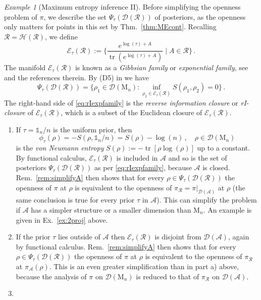 \documentclass[a4paper,11pt,reqno]{amsart}
\newcommand{\M}{\mathrm{M}}
\newcommand{\cA}{\mathcal{A}}
\newcommand{\cD}{\mathcal{D}}
\newcommand{\cE}{\mathcal{E}}
\newcommand{\cH}{\mathcal{H}}
\newcommand{\cR}{\mathcal{R}}
\newcommand{\id}{\mathds{1}}
\DeclareMathOperator\tr{tr}
\theoremstyle{definition}
\theoremstyle{remark}
\newtheorem{exa}[thm]{Example}
\numberwithin{equation}{section}
\begin{document}
\begin{exa}[Maximum entropy inference II]\label{exa:ME2}
Before simplifying the openness problem of $\pi$, we describe the set 
$\Psi_\tau(\cD(\cR))$ of posteriors, as the openness only matters for
points in this set by Thm.~\ref{thm:MEcont}. Recalling $\cR=\cH(\cR)$, 
we define 
\[\textstyle
\cE_\tau(\cR)
:=\big\{ \frac{e^{\log(\tau)+A}}{\tr(e^{\log(\tau)+A})} \mid A\in\cR\big\}\,.
\]
The manifold $\cE_\tau(\cR)$ is known as a \emph{Gibbsian family} or 
\emph{exponential family}, see 
\cite{WeisKnauf2012,Niekamp-etal2013,Weis2014,Pavlov-etal2024} and the 
references therein. By (D5) in \cite{Weis2014} we have
\begin{equation}\label{eq:rIexpfamily}\textstyle
\Psi_\tau(\cD(\cR))=
\{\rho_1\in\cD(\M_n):\inf_{\rho_2\in\cE_\tau(\cR)}S(\rho_1,\rho_2)=0\}\,.
\end{equation}
The right-hand side of \eqref{eq:rIexpfamily} is the 
\emph{reverse information closure} or \emph{rI-closure} \cite{CsiszarMatus2003} 
of $\cE_\tau(\cR)$, which is a subset of the Euclidean closure of 
$\cE_\tau(\cR)$.
\par
%
\begin{enumerate}
\item[a)]
If $\tau=\id_n/n$ is the uniform prior, then
\[\textstyle
\phi_\tau(\rho)
=-S(\rho,\id_n/n)
=S(\rho)-\log(n)\,,
\quad
\rho\in\cD(\M_n)
\]
is the \emph{von Neumann entropy} $S(\rho):=-\tr[\rho\log(\rho)]$ up to a 
constant. By functional calculus, $\cE_\tau(\cR)$ is included in $\cA$ and 
so is the set of posteriors $\Psi_\tau(\cD(\cR))$ as per \eqref{eq:rIexpfamily}, 
because $\cA$ is closed. Rem.~\ref{rem:simplifyA} then shows that for every 
$\rho\in\Psi_\tau(\cD(\cR))$ the openness of $\pi$ at $\rho$ is equivalent 
to the openness of $\pi_\cR=\pi|_{\cD(\cA)}$ at $\rho$
(the same conclusion is true for every prior $\tau$ in $\cA$). This can 
simplify the problem if $\cA$ has a simpler structure or a smaller dimension 
than $\M_n$. An example is given in Ex.~\ref{ex:2proj} above.  
%
\item[b)]
If the prior $\tau$ lies outside of $\cA$ then $\cE_\tau(\cR)$ is disjoint 
from $\cD(\cA)$, again by functional calculus. Rem.~\ref{rem:simplifyA} 
then shows that for every $\rho\in\Psi_\tau(\cD(\cR))$ the openness of $\pi$ 
at $\rho$ is equivalent to the openness of $\pi_\cR$ at $\pi_\cA(\rho)$.
This is an even greater simplification than in part a) above, because the 
analysis of $\pi$ on $\cD(\M_n)$ is reduced to that of $\pi_\cR$ on 
$\cD(\cA)$.
%
\item[c)]

\end{enumerate}
\end{exa}
\end{document}
